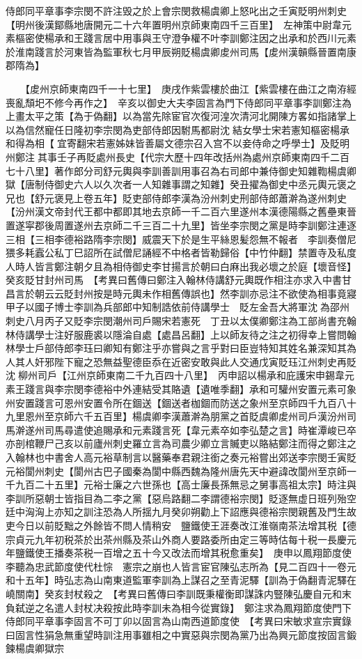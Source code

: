 侍郎同平章事李宗閔不許注毁之於上會宗閔救楊虞卿上怒叱出之壬寅貶明州刺史【明州後漢鄮縣地唐開元二十六年置明州京師東南四千三百里】　左神策中尉韋元素樞密使楊承和王踐言居中用事與王守澄争權不叶李訓鄭注因之出承和於西川元素於淮南踐言於河東皆為監軍秋七月甲辰朔貶楊虞卿䖍州司馬【䖍州漢贑縣晉置南康郡隋為】

　　【䖍州京師東南四千一十七里】　庚戌作紫雲樓於曲江【紫雲樓在曲江之南洊經喪亂頹圯不修今再作之】　辛亥以御史大夫李固言為門下侍郎同平章事李訓鄭注為上畫太平之策【為于偽翻】以為當先除宦官次復河湟次清河北開陳方畧如指諸掌上以為信然寵任日隆初李宗閔為吏部侍郎因駙馬都尉沈結女學士宋若憲知樞密楊承和得為相【宜寄翻宋若憲姊妹皆善屬文德宗召入宫不以妾侍命之呼學士】及貶明州鄭注其事壬子再貶處州長史【代宗大歷十四年改括州為處州京師東南四千二百七十八里】著作郎分司舒元輿與李訓善訓用事召為右司郎中兼侍御史知雜鞫楊虞卿獄【唐制侍御史六人以久次者一人知雜事謂之知雜】癸丑擢為御史中丞元輿元褒之兄也【舒元褒見上卷五年】貶吏部侍郎李漢為汾州刺史刑部侍郎蕭澣為遂州刺史【汾州漢文帝封代王都中都即其地去京師一千二百六里遂州本漢德陽縣之舊壘東晉置遂寜郡後周置遂州去京師二千三百二十九里】皆坐李宗閔之黨是時李訓鄭注連逐三相【三相李德裕路隋李宗閔】威震天下於是生平絲恩髪怨無不報者　李訓奏僧尼猥多耗蠧公私丁巳詔所在試僧尼誦經不中格者皆勒歸俗【中竹仲翻】禁置寺及私度人時人皆言鄭注朝夕且為相侍御史李甘揚言於朝曰白麻出我必壞之於庭【壞音怪】癸亥貶甘封州司馬　【考異曰舊傳曰鄭注入翰林侍講舒元輿既作相注亦求入中書甘昌言於朝云云貶封州按是時元輿未作相舊傳誤也】然李訓亦忌注不欲使為相事竟寢　甲子以國子博士李訓為兵部郎中知制誥依前侍講學士　貶左金吾大將軍沈為邵州刺史八月丙子又貶李宗閔潮州司戶賜宋若憲死　丁丑以太僕卿鄭注為工部尚書充翰林侍講學士注好服鹿裘以隱淪自處【處昌呂翻】上以師友待之注之初得幸上嘗問翰林學士戶部侍郎李珏曰卿知有鄭注乎亦嘗與之言乎對曰臣豈特知其姓名兼深知其為人其人奸邪陛下寵之恐無益聖德臣忝在近密安敢與此人交通戊寅貶珏江州刺史再貶沈柳州司戶【江州京師東南二千九百四十八里】　丙申詔以楊承和庇護宋申錫韋元素王踐言與李宗閔李德裕中外連結受其賂遺【遺唯季翻】承和可驩州安置元素可象州安置踐言可恩州安置令所在錮送【錮送者枷錮而防送之象州至京師四千九百八十九里恩州至京師六千五百里】楊虞卿李漢蕭澣為朋黨之首貶虞卿䖍州司戶漢汾州司馬澣遂州司馬尋遣使追賜承和元素踐言死【韋元素卒如李弘楚之言】時崔潭峻已卒亦剖棺鞭尸己亥以前廬州刺史羅立言為司農少卿立言贓吏以賂結鄭注而得之鄭注之入翰林也中書舍人高元裕草制言以醫藥奉君親注銜之奏元裕嘗出郊送李宗閔壬寅貶元裕閬州刺史【閬州古巴子國秦為閬中縣西魏為隆州唐先天中避諱改閬州至京師一千九百二十五里】元裕士廉之六世孫也【高士廉長孫無忌之舅事高祖太宗】時注與李訓所惡朝士皆指目為二李之黨【惡烏路翻二李謂德裕宗閔】貶逐無虚日班列殆空廷中洶洶上亦知之訓注恐為人所揺九月癸卯朔勸上下詔應與德裕宗閔親舊及門生故吏今日以前貶黜之外餘皆不問人情稍安　鹽鐵使王涯奏改江淮嶺南茶法增其税【德宗貞元九年初税茶於出茶州縣及茶山外商人要路委所由定三等時估每十税一長慶元年鹽鐵使王播奏茶税一百增之五十今又改法而增其税愈重矣】　庚申以鳳翔節度使李聽為忠武節度使代杜悰　憲宗之崩也人皆言宦官陳弘志所為【見二百四十一卷元和十五年】時弘志為山南東道監軍李訓為上謀召之至青泥驛【訓為于偽翻青泥驛在嶢關南】癸亥封杖殺之　【考異曰舊傳曰李訓既秉權衡即謀誅内豎陳弘慶自元和末負弑逆之名遣人封杖决殺按此時李訓未為相今從實錄】　鄭注求為鳳翔節度使門下侍郎同平章事李固言不可丁卯以固言為山南西道節度使　【考異曰宋敏求宣宗實錄曰固言性狷急無重望時訓注用事雖相之中實惡與宗閔為黨乃出為興元節度按固言鍛鍊楊虞卿獄宗